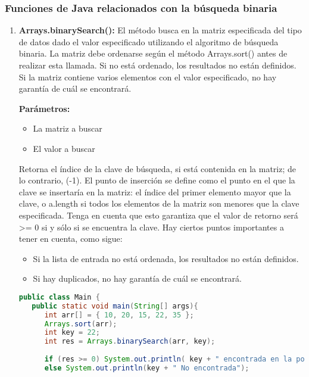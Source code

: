 \subsubsection{Funciones de Java relacionados con la búsqueda binaria}

\begin{enumerate}
	\item \textbf{Arrays.binarySearch():} El método busca en la matriz especificada del tipo de datos dado el valor especificado utilizando el algoritmo de búsqueda binaria. La matriz debe ordenarse según el método Arrays.sort() antes de realizar esta llamada. Si no está ordenado, los resultados no están definidos. Si la matriz contiene varios elementos con el valor especificado, no hay garantía de cuál se encontrará.
	
	\textbf{Parámetros:}
	
	\begin{itemize}
		\item La matriz a buscar
		\item  El valor a buscar
	\end{itemize}
   
   Retorna el índice de la clave de búsqueda, si está contenida en la matriz; de lo contrario, (-1). El punto de inserción se define como el punto en el que la clave se insertaría en la matriz: el índice del primer elemento mayor que la clave, o a.length si todos los elementos de la matriz son menores que la clave especificada. Tenga en cuenta que esto garantiza que el valor de retorno será >= 0 si y sólo si se encuentra la clave. Hay ciertos puntos importantes a tener en cuenta, como sigue:
   
   \begin{itemize}
   	\item Si la lista de entrada no está ordenada, los resultados no están definidos.
   	\item Si hay duplicados, no hay garantía de cuál se encontrará. 
   \end{itemize}

\begin{lstlisting}[language=Java]
public class Main {
   public static void main(String[] args){
      int arr[] = { 10, 20, 15, 22, 35 };
      Arrays.sort(arr);
      int key = 22;
      int res = Arrays.binarySearch(arr, key);
		
      if (res >= 0) System.out.println( key + " encontrada en la posicion = " + res);
      else System.out.println(key + " No encontrada");
		

\end{lstlisting}
\end{enumerate}
